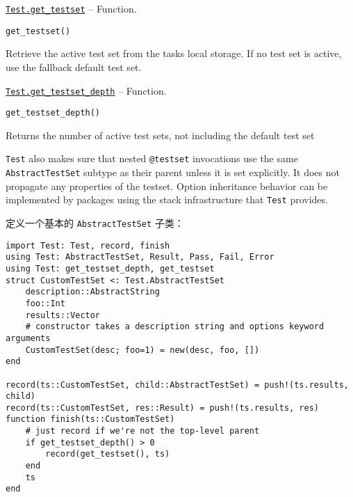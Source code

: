 \hypertarget{16535119297156519849}{} 
\hyperlink{16535119297156519849}{\texttt{Test.get\_testset}}  -- {Function.}

\begin{adjustwidth}{2em}{0pt}


\begin{verbatim}
get_testset()
\end{verbatim}

Retrieve the active test set from the task{\textquotesingle}s local storage. If no test set is active, use the fallback default test set.



\end{adjustwidth}
\hypertarget{6664474132755078304}{} 
\hyperlink{6664474132755078304}{\texttt{Test.get\_testset\_depth}}  -- {Function.}

\begin{adjustwidth}{2em}{0pt}


\begin{verbatim}
get_testset_depth()
\end{verbatim}

Returns the number of active test sets, not including the default test set



\end{adjustwidth}

\texttt{Test} also makes sure that nested \texttt{@testset} invocations use the same \texttt{AbstractTestSet} subtype as their parent unless it is set explicitly. It does not propagate any properties of the testset. Option inheritance behavior can be implemented by packages using the stack infrastructure that \texttt{Test} provides.



定义一个基本的 \texttt{AbstractTestSet} 子类：




\begin{verbatim}
import Test: Test, record, finish
using Test: AbstractTestSet, Result, Pass, Fail, Error
using Test: get_testset_depth, get_testset
struct CustomTestSet <: Test.AbstractTestSet
    description::AbstractString
    foo::Int
    results::Vector
    # constructor takes a description string and options keyword arguments
    CustomTestSet(desc; foo=1) = new(desc, foo, [])
end

record(ts::CustomTestSet, child::AbstractTestSet) = push!(ts.results, child)
record(ts::CustomTestSet, res::Result) = push!(ts.results, res)
function finish(ts::CustomTestSet)
    # just record if we're not the top-level parent
    if get_testset_depth() > 0
        record(get_testset(), ts)
    end
    ts
end
\end{verbatim}



